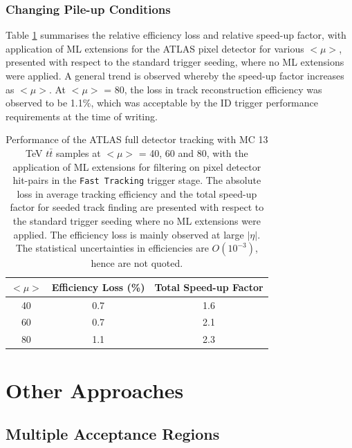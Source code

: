 \subsubsection{Changing Pile-up Conditions}

Table \ref{tab:pileup} summarises the relative efficiency loss and relative speed-up factor, with application of ML extensions for the ATLAS pixel detector for various $<\mu>$, presented with respect to the standard trigger seeding, where no ML extensions were applied. A general trend is observed whereby the speed-up factor increases as $<\mu>$. At $<\mu>$ = 80, the loss in track reconstruction efficiency was observed to be 1.1\%, which was acceptable by the ID trigger performance requirements at the time of writing.


\begin{table}[!htbp]
\caption{Performance of the ATLAS full detector tracking with MC 13 TeV $t\bar{t}$ samples at $<\mu>$ = 40, 60 and 80, with the application of ML extensions for filtering on pixel detector hit-pairs in the \texttt{Fast Tracking} trigger stage\cite{public-hlt}. The absolute loss in average tracking efficiency and the total speed-up factor for seeded track finding are presented with respect to the standard trigger seeding where no ML extensions were applied. The efficiency loss is mainly observed at large $|\eta|$. The statistical uncertainties in efficiencies are $O(10^{-3})$, hence are not quoted.}
\begin{center}
\begin{tabular}{ccc}
\toprule
$<\mu>$ & Efficiency Loss (\%) & Total Speed-up Factor  \\
\hline
40 & 0.7 & 1.6 \\
60 & 0.7 & 2.1 \\
80 & 1.1 & 2.3 \\
\bottomrule
\end{tabular}
\end{center}
\label{tab:pileup}
\end{table}


\section{Other Approaches}
\subsection{Multiple Acceptance Regions}

